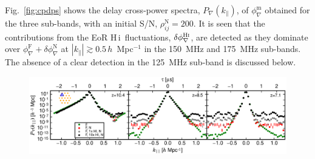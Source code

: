 \documentclass[
reprint,
superscriptaddress,
amsmath,
amssymb,
aps,
prd
]{revtex4-1}
\newcommand{\HI}{H\,{\sc i}}
\begin{document}
Fig.~\ref{fig:cpdps} shows the delay cross-power spectra, $P_\nabla(k_\parallel)$, of $\phi_\nabla^\textrm{m}$ obtained for the three sub-bands, with an initial S/N, $\rho_{ij}^\textrm{N}=200$. It is seen that the contributions from the EoR \HI\ fluctuations, $\delta\phi_\nabla^\textrm{H{\sc i}}$, are detected as they dominate over $\phi_\nabla^\textrm{F} + \delta\phi_\nabla^\textrm{N}$ at $|k_\parallel| \gtrsim 0.5\,h$~Mpc$^{-1}$ in the 150~MHz and 175~MHz sub-bands. The absence of a clear detection in the 125~MHz sub-band is discussed below.

\begin{figure}[htb]
  \includegraphics[width=\linewidth]{cpdps_all_subbands_SNR_200_nsamples_1048576}

\end{figure}
\end{document}
